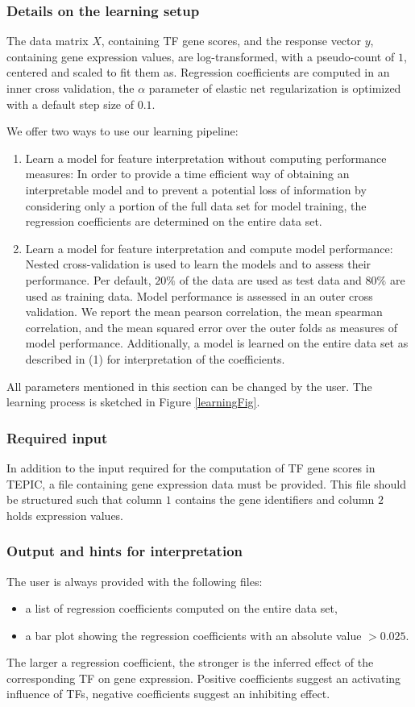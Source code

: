 \documentclass{article}
\begin{document}
\subsubsection{Details on the learning setup}
The data matrix $X$, containing TF gene scores, and the response vector $y$, containing gene expression values, are log-transformed, 
with a pseudo-count of $1$, centered and scaled to fit them as. 
Regression coefficients are computed in an inner cross validation,
the $\alpha$ parameter of elastic net regularization is optimized with a default step size of $0.1$.

We offer two ways to use our learning pipeline:
\begin{enumerate}
\item{Learn a model for feature interpretation without computing performance measures:
In order to provide a time efficient way of obtaining an interpretable model and to prevent a potential loss of information
by considering only a portion of the full data set for model training, the regression coefficients are determined on the entire data set.}
\item{Learn a model for feature interpretation and compute model performance: 
Nested cross-validation is used to learn the models and to assess their performance. 
Per default, $20\%$ of the data are used as test data and $80\%$ are used as training data. 
Model performance is assessed in an outer cross validation. 
We report the mean pearson correlation, the mean spearman correlation, and the mean squared error over the outer folds as measures of model performance.
Additionally, a model is learned on the entire data set as described in (1) for interpretation of the coefficients.}
\end{enumerate}
All parameters mentioned in this section can be changed by the user. The learning process is sketched in Figure \ref{learningFig}.

\subsubsection{Required input}
In addition to the input required for the computation of TF gene scores in TEPIC, a file containing gene expression data must be provided.
This file should be structured such that column $1$ contains the gene identifiers and column $2$ holds expression values.

\subsubsection{Output and hints for interpretation}
The user is always provided with the following files:
\begin{itemize}
\item a list of regression coefficients computed on the entire data set,
\item a bar plot showing the regression coefficients with an absolute value $> 0.025$.
\end{itemize}
The larger a regression coefficient, the stronger is the inferred effect of the corresponding TF on gene expression. Positive coefficients suggest an activating influence of TFs,
negative coefficients suggest an inhibiting effect. 
\end{document}
